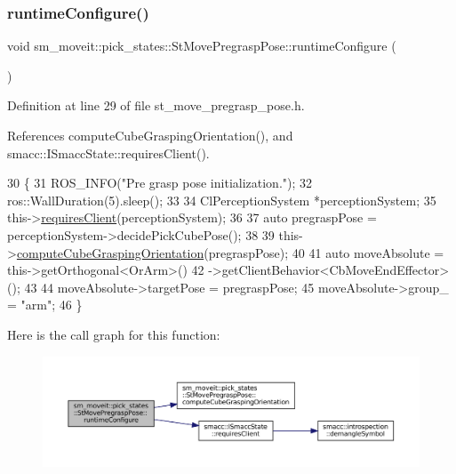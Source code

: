 \subsubsection{\texorpdfstring{runtime\+Configure()}{runtimeConfigure()}}
{\footnotesize\ttfamily void sm\+\_\+moveit\+::pick\+\_\+states\+::\+St\+Move\+Pregrasp\+Pose\+::runtime\+Configure (\begin{DoxyParamCaption}{ }\end{DoxyParamCaption})\hspace{0.3cm}{\ttfamily [inline]}}



Definition at line 29 of file st\+\_\+move\+\_\+pregrasp\+\_\+pose.\+h.



References compute\+Cube\+Grasping\+Orientation(), and smacc\+::\+I\+Smacc\+State\+::requires\+Client().


\begin{DoxyCode}
30     \{
31         ROS\_INFO(\textcolor{stringliteral}{"Pre grasp pose initialization."});
32         ros::WallDuration(5).sleep();
33 
34         ClPerceptionSystem *perceptionSystem;
35         this->\hyperlink{classsmacc_1_1ISmaccState_a7f95c9f0a6ea2d6f18d1aec0519de4ac}{requiresClient}(perceptionSystem);
36         
37         \textcolor{keyword}{auto} pregraspPose = perceptionSystem->decidePickCubePose();
38 
39         this->\hyperlink{structsm__moveit_1_1pick__states_1_1StMovePregraspPose_afe2fcedf9034c3c2999e81fb289cf459}{computeCubeGraspingOrientation}(pregraspPose);
40 
41         \textcolor{keyword}{auto} moveAbsolute = this->getOrthogonal<OrArm>()
42                                 ->getClientBehavior<CbMoveEndEffector>();
43 
44         moveAbsolute->targetPose = pregraspPose;
45         moveAbsolute->group\_ = \textcolor{stringliteral}{"arm"};
46     \}
\end{DoxyCode}
Here is the call graph for this function\+:
\nopagebreak
\begin{figure}[H]
\begin{center}
\leavevmode
\includegraphics[width=350pt]{structsm__moveit_1_1pick__states_1_1StMovePregraspPose_a2cb64008501b9572198a6767ec1f1fb0_cgraph}
\end{center}
\end{figure}
\mbox{\label{structsm__moveit_1_1pick__states_1_1StMovePregraspPose_a06a3b0a3c8bd47cf6a6c77e54421d592}} 
